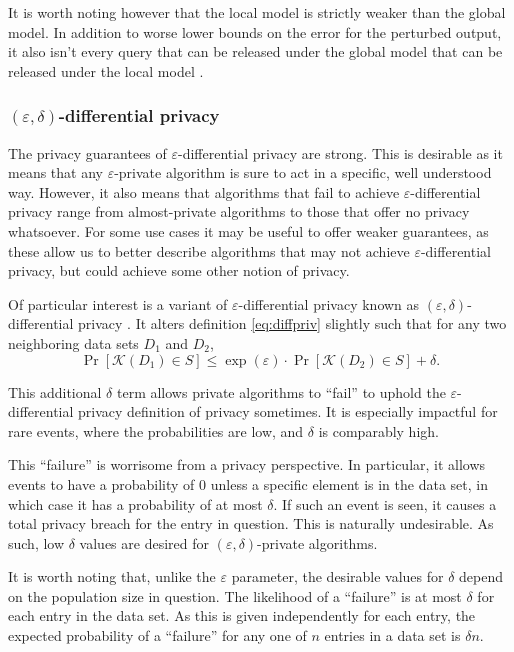 \documentclass[12pt]{article}
\newcommand{\fancy}{\mathcal}
\renewcommand{\epsilon}{\varepsilon}
\begin{document}
It is worth noting however that the local model is strictly weaker than the global model. In addition to worse lower bounds on the error for the perturbed output, it also isn't every query that can be released under the global model that can be released under the local model \cite[sec.~12.1]{dwork_privacybook}.

\subsubsection{$(\epsilon, \delta)$-differential privacy \label{sec:variant_eps_delta}}

The privacy guarantees of $\epsilon$-differential privacy are strong. This is desirable as it means that any $\epsilon$-private algorithm is sure to act in a specific, well understood way. However, it also means that algorithms that fail to achieve $\epsilon$-differential privacy range from almost-private algorithms to those that offer no privacy whatsoever. For some use cases it may be useful to offer weaker guarantees, as these allow us to better describe algorithms that may not achieve $\epsilon$-differential privacy, but could achieve some other notion of privacy.

Of particular interest is a variant of $\epsilon$-differential privacy known as $(\epsilon, \delta)$-differential privacy \cite{dwork2006_delta_diffpriv}. It alters definition \ref{eq:diffpriv} slightly such that for any two neighboring data sets $D_1$ and $D_2$,
\begin{equation*}
    \Pr[\fancy{K}(D_1) \in S] \leq \exp(\epsilon) \cdot \Pr[\fancy{K}(D_2) \in S] + \delta.
\end{equation*}

This additional $\delta$ term allows private algorithms to ``fail'' to uphold the $\epsilon$-differential privacy definition of privacy sometimes. It is especially impactful for rare events, where the probabilities are low, and $\delta$ is comparably high.

This ``failure'' is worrisome from a privacy perspective. In particular, it allows events to have a probability of 0 unless a specific element is in the data set, in which case it has a probability of at most $\delta$. If such an event is seen, it causes a total privacy breach for the entry in question. This is naturally undesirable. As such, low $\delta$ values are desired for $(\epsilon,\delta)$-private algorithms.

It is worth noting that, unlike the $\epsilon$ parameter, the desirable values for $\delta$ depend on the population size in question. The likelihood of a ``failure'' is at most $\delta$ for each entry in the data set. As this is given independently for each entry, the expected probability of a ``failure'' for any one of $n$ entries in a data set is $\delta n$.\bigskip
\end{document}
